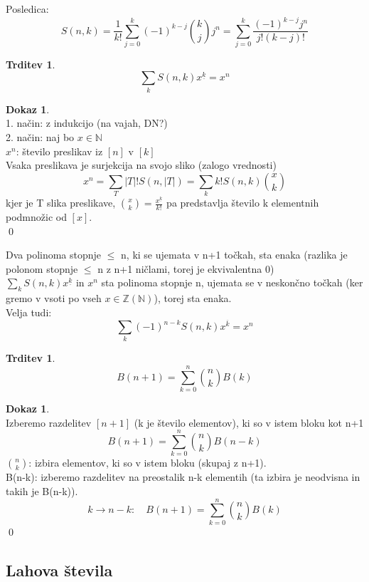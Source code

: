 \documentclass[a4paper,12pt]{article}
\theoremstyle{definition}
\newtheorem{claim}[counter]{Trditev}
\newtheorem{pro}[counter]{Dokaz}
\theoremstyle{remark}
\newcommand{\N}{\mathbb{N}}
\newcommand{\Z}{\mathbb{Z}}
\begin{document}
Posledica: \[S(n,k) = \frac{1}{k!} \sum_{j=0}^k (-1)^{k-j} \binom{k}{j}j^n =
    \sum_{j=0}^k \frac{(-1)^{k-j} j^n}{j! (k-j)!}\]

\begin{claim}
    \[\sum_k S(n,k)x^{\underline{k}} = x^n\]
\end{claim}

\begin{pro}\mbox{} \\
    1. način: z indukcijo (na vajah, DN?) \\
    2. način: naj bo $x \in \N$ \\
    $x^n$: število preslikav iz $[n]$ v $[k]$ \\
    Vsaka preslikava je surjekcija na svojo sliko (zalogo vrednosti) \\
    \[x^n = \sum_T |T|! S(n,|T|) = \sum_k k! S(n,k) \binom{x}{k}\]
    kjer je T slika preslikave, $\binom{x}{k} = \frac{x^{\underline{k}}}{k!}$ pa
        predstavlja število k elementnih podmnožic od $[x]$. \\
    \qed
\end{pro}

Dva polinoma stopnje $\leq$ n, ki se ujemata v n+1 točkah, sta enaka (razlika je polonom stopnje $\leq$ n
    z n+1 ničlami, torej je ekvivalentna 0) \\
$\sum_k S(n,k)x^{\underline{k}}$ in $x^n$ sta polinoma stopnje n, ujemata se v neskončno točkah
    (ker gremo v vsoti po vseh $x \in \Z(\N)$), torej sta enaka. \\
Velja tudi: \[\sum_k (-1)^{n-k} S(n,k) x^{\overline{k}} = x^n\]

\begin{claim}
    \[B(n+1) = \sum_{k=0}^n \binom{n}{k} B(k)\]
\end{claim}

\begin{pro}\mbox{} \\
    Izberemo razdelitev $[n+1]$ (k je število elementov), ki so v istem bloku kot n+1 \\
    \[B(n+1) = \sum_{k=0}^n \binom{n}{k}B(n-k)\]
    $\binom{n}{k}$: izbira elementov, ki so v istem bloku (skupaj z n+1). \\
    B(n-k): izberemo razdelitev na preostalik n-k elementih (ta izbira je neodvisna in takih je B(n-k)).
    \[k \rightarrow n-k: \quad B(n+1) = \sum_{k=0}^n \binom{n}{k}B(k)\]
    \qed
\end{pro}

\subsection{Lahova števila}
\end{document}
